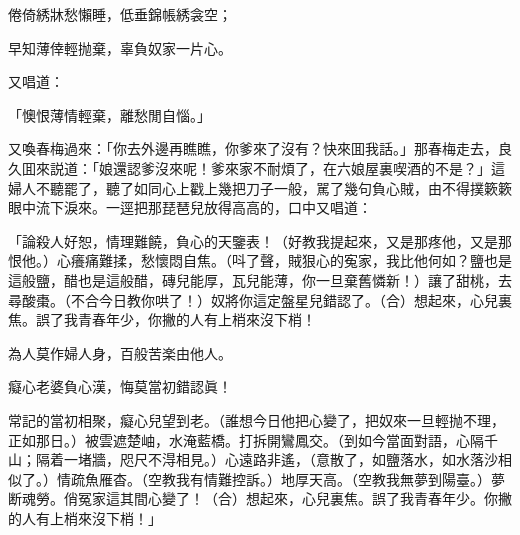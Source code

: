 \begin{myquote}
倦倚綉牀愁懶睡，低垂錦帳綉衾空；

早知薄倖輕抛棄，辜負奴家一片心。
\end{myquote}

又唱道：

\begin{myquote}
「懊恨薄情輕棄，離愁閒自惱。」
\end{myquote}

又喚春梅過來：「你去外邊再瞧瞧，你爹來了沒有？快來囬我話。」那春梅走去，良久囬來説道：「娘還認爹沒來呢！爹來家不耐煩了，在六娘屋裏喫酒的不是？」這婦人不聽罷了，聽了如同心上戳上幾把刀子一般，駡了幾句負心賊，由不得撲簌簌眼中流下淚來。一逕把那琵琶兒放得高高的，口中又唱道：

\begin{myquote}
「論殺人好恕，情理難饒，負心的天鑒表！{\marktext\small\color{mydarkgray}（好教我提起來，又是那疼他，又是那恨他。）}心癢痛難揉，愁懷悶自焦。{\marktext\small\color{mydarkgray}（呌了聲，賊狠心的寃家，我比他何如？鹽也是這般鹽，醋也是這般醋，磚兒能厚，瓦兒能薄，你一旦棄舊憐新！）}讓了甜桃，去尋酸棗。{\marktext\small\color{mydarkgray}（不合今日教你哄了！）}奴將你這定盤星兒錯認了。{\marktext\small（合）}想起來，心兒裏焦。誤了我青春年少，你撇的人有上梢來沒下梢！　

為人莫作婦人身，百般苦楽由他人。

癡心老婆負心漢，悔莫當初錯認眞！

常記的當初相聚，癡心兒望到老。{\marktext\small\color{mydarkgray}（誰想今日他把心變了，把奴來一旦輕抛不理，正如那日。）}被雲遮楚岫，水淹藍橋。打拆開鸞鳳交。{\marktext\small\color{mydarkgray}（到如今當面對語，心隔千山；隔着一堵牆，咫尺不淂相見。）}心遠路非遙，{\marktext\small\color{mydarkgray}（意散了，如鹽落水，如水落沙相似了。）}情疏魚雁杳。{\marktext\small\color{mydarkgray}（空教我有情難控訴。）}地厚天高。{\marktext\small\color{mydarkgray}（空教我無夢到陽臺。）}夢断魂勞。俏冤家這其間心變了！{\marktext\small（合）}想起來，心兒裏焦。誤了我青春年少。你撇的人有上梢來沒下梢！」
\end{myquote}

